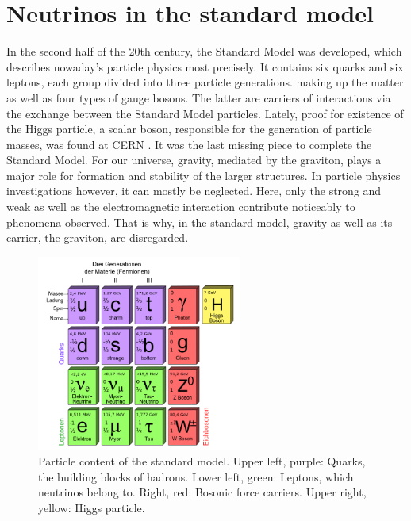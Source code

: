 	
	
    \section{Neutrinos in the standard model}
    \label{ch:Introduction:sec:Neutrinos in the Standard Model}
    In the second half of the 20th century, the Standard Model was developed, which describes nowaday's particle physics most precisely. It contains six quarks and six leptons, each group divided into three particle generations. making up the matter as well as four types of gauge bosons. The latter are carriers of interactions via the exchange between the Standard Model particles.
    Lately, proof for existence of the Higgs particle, a scalar boson, responsible for the generation of particle masses, was found at CERN \cite{CMS, ATLAS}. It was the last missing piece to complete the Standard Model.
    For our universe, gravity, mediated by the graviton, plays a major role for formation and stability of the larger structures. In particle physics investigations however, it can mostly be neglected. Here, only the strong and weak as well as the electromagnetic interaction contribute noticeably to phenomena observed. That is why, in the standard model, gravity as well as its carrier, the graviton, are disregarded.
    \begin{figure}
    	\centering
    	\includegraphics[width = 0.6\textwidth]{graphics/standardModel/Standard_Model_of_Elementary_Particles-de.png}
    	\caption[Standard Model Particles]{Particle content of the standard model. Upper left, purple: Quarks, the building blocks of hadrons. Lower left, green: Leptons, which neutrinos belong to. Right, red: Bosonic force carriers. Upper right, yellow: Higgs particle. \cite{particlesSM}}
    	\label{fig:standardModel:particles}
    \end{figure}
	
